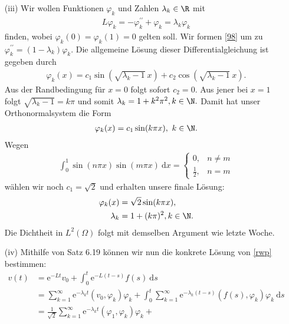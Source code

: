 \begin{solution}
\begin{itemize}
    \item[(iii)] Wir wollen Funktionen $\varphi_k$ und Zahlen $\lambda_k \in \R$ mit
    \begin{align}\label{98}
        L\varphi_k = - \varphi_k^{\prime\prime} + \varphi_k = \lambda_k\varphi_k
    \end{align}
    finden, wobei $\varphi_k(0) = \varphi_k(1) = 0$ gelten soll.
    Wir formen \eqref{98} um zu $\varphi_k^{\prime\prime} = (1 - \lambda_k) \varphi_k$.
    Die allgemeine Lösung dieser Differentialgleichung ist gegeben durch
    \begin{align*}
        \varphi_k(x) = c_1 \sin(\sqrt{\lambda_k - 1}~ x) + c_2 \cos(\sqrt{\lambda_k - 1}~ x).
    \end{align*}
    Aus der Randbedingung für $x = 0$ folgt sofort $c_2 = 0.$ Aus jener bei $x = 1$ folgt $\sqrt{\lambda_k - 1} = k\pi$ und somit $\lambda_k = 1 + k^2\pi^2, k \in \N.$
    Damit hat unser Orthonormalsystem die Form
    \begin{align*}
        \varphi_k(x) = c_1 \sin(k\pi x),~ k \in \N.
    \end{align*}
    Wegen
    \begin{align*}
        \int_0^1 \sin(n\pi x) \sin(m\pi x) \mathrm{~d}x =
        \begin{cases}
            0, & n \neq m\\
            \frac{1}{2}, & n = m
        \end{cases}
    \end{align*}
    wählen wir noch $c_1 = \sqrt 2$ und erhalten unsere finale Lösung:
    \begin{align*}
        \varphi_k(x) &= \sqrt 2 \sin(k\pi x),\\
        \lambda_k &= 1 + (k\pi)^2, k \in \N.
    \end{align*}
    Die Dichtheit in $L^2(\Omega)$ folgt mit demselben Argument wie letzte Woche.
    \item[(iv)] Mithilfe von Satz 6.19 können wir nun die konkrete Lösung von \eqref{rwp} bestimmen:
    \begin{align*}
        v(t) &= \mathrm{e}^{-Lt}v_0 + \int_0^t \mathrm{e}^{-L(t-s)} f(s) \mathrm{~d} s\\
        &= \sum_{k = 1}^\infty \mathrm{e}^{-\lambda_k t}(v_0, \varphi_k) \varphi_k + \int_0^t \sum_{k = 1}^\infty \mathrm{e}^{-\lambda_k (t-s)}(f(s), \varphi_k) \varphi_k \mathrm{~d} s\\
        &= \frac{1}{\sqrt{2}}\sum_{k = 1}^\infty \mathrm{e}^{-\lambda_k t}(\varphi_1, \varphi_k) \varphi_k +

\end{align*}
\end{itemize}
\end{solution}
